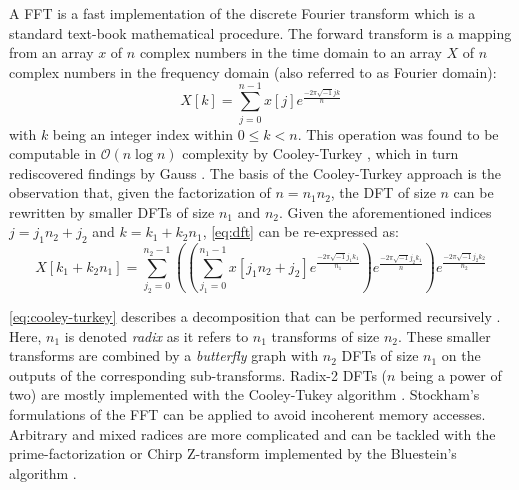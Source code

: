 A FFT is a fast implementation of the discrete Fourier transform which is a standard text-book mathematical procedure. The forward transform is a mapping from an array $x$ of $n$ complex numbers in the time domain to an array $X$ of $n$ complex numbers in the frequency domain (also referred to as Fourier domain):
%
\begin{equation}
  \label{eq:dft}
  X[k] = \sum_{j=0}^{n-1} x[j]e^{\frac{-2\pi\sqrt{-1}jk}{n}}
\end{equation}
%
with $k$ being an integer index within $0 \le k < n$. This operation was found to be computable in $\mathcal{O}(n \log n)$ complexity by Cooley-Turkey \cite{cooley1965algorithm}, which in turn rediscovered findings by Gauss \cite{gauss}. The basis of the Cooley-Turkey approach is the observation that, given the factorization of $n=n_1n_2$, the  DFT of size $n$ can be rewritten by smaller DFTs of size $n_1$ and $n_2$. Given the aforementioned indices $j=j_1n_2 + j_2$ and $k=k_1+k_2n_1$, \cref{eq:dft} can be re-expressed as:
%
\begin{equation}
  \label{eq:cooley-turkey}
  X[k_1{+}k_2n_1] = \sum_{j_2=0}^{n_2-1} \left( \left( \sum_{j_1=0}^{n_1-1} x[j_1n_2{+}j_2] e^{\frac{-2\pi\sqrt{-1}j_1k_1}{n_1}} \right) e^{\frac{-2\pi\sqrt{-1}j_2k_1}{n}} \right) e^{\frac{-2\pi\sqrt{-1}j_2k_2}{n_2}}
\end{equation}

\cref{eq:cooley-turkey} describes a decomposition that can be performed recursively \cite{FFTW05}. Here, $n_1$ is denoted \emph{radix} as it refers to $n_1$ transforms of size $n_2$. These smaller transforms are combined by a \emph{butterfly} graph with $n_2$ DFTs of size $n_1$ on the outputs of the corresponding sub-transforms. Radix-2 DFTs ($n$ being a power of two) are mostly implemented with the Cooley-Tukey algorithm \cite{cooley1965algorithm}. Stockham's formulations of the FFT can be applied \cite{stockham1966high} to avoid incoherent memory accesses. Arbitrary and mixed radices are more complicated and can be tackled with the prime-factorization or Chirp Z-transform implemented by the Bluestein's algorithm \cite{bluestein}. 

